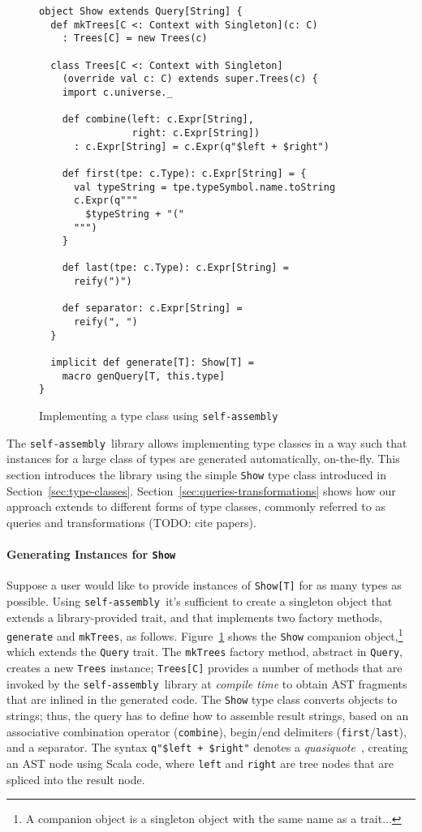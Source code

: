 \documentclass[preprint]{sigplanconf}
\newcommand{\selfassembly}{\texttt{self-assembly~}}
\begin{document}
\begin{figure}
\centering
\begin{lstlisting}
object Show extends Query[String] {
  def mkTrees[C <: Context with Singleton](c: C)
    : Trees[C] = new Trees(c)

  class Trees[C <: Context with Singleton]
    (override val c: C) extends super.Trees(c) {
    import c.universe._

    def combine(left: c.Expr[String],
                right: c.Expr[String])
      : c.Expr[String] = c.Expr(q"$left + $right")

    def first(tpe: c.Type): c.Expr[String] = {
      val typeString = tpe.typeSymbol.name.toString
      c.Expr(q"""
        $typeString + "("
      """)
    }

    def last(tpe: c.Type): c.Expr[String] =
      reify(")")

    def separator: c.Expr[String] =
      reify(", ")
  }

  implicit def generate[T]: Show[T] =
    macro genQuery[T, this.type]
}
\end{lstlisting}
  \caption{Implementing a type class using \selfassembly}
  \label{fig:basic-usage}
\end{figure}

The \selfassembly library allows implementing type classes in a way such that
instances for a large class of types are generated automatically, on-the-fly.
This section introduces the library using the simple \verb|Show| type class
introduced in Section~\ref{sec:type-classes}. Section~\ref{sec:queries-transformations}
shows how our approach extends to different forms of type classes, commonly referred to
as queries and transformations (TODO: cite papers).

\paragraph{Generating Instances for \texttt{Show}} Suppose a user would like
to provide instances of \verb|Show[T]| for as many
types as possible. Using \selfassembly it's sufficient to create a singleton
object that extends a library-provided trait, and that implements two factory
methods, \verb|generate| and \verb|mkTrees|, as follows.
Figure~\ref{fig:basic-usage} shows the \verb|Show| companion object,\footnote{A companion
object is a singleton object with the same name as a trait...} which extends
the \verb|Query| trait. The \verb|mkTrees| factory method, abstract in \verb|Query|,
creates a new \verb|Trees| instance; \verb|Trees[C]| provides a number of methods that
are invoked by the \selfassembly library at \emph{compile time} to obtain AST fragments that are
inlined in the generated code. The \verb|Show| type class converts objects to
strings; thus, the query has to define how to assemble result strings, based
on an associative combination operator (\verb|combine|), begin/end delimiters
(\verb|first|/\verb|last|), and a separator. The syntax
\verb|q"$left + $right"| denotes a \emph{quasiquote}~\cite{Quasiquotes},
creating an AST node using Scala code, where \verb|left| and \verb|right|
are tree nodes that are spliced into the result node.
\end{document}

